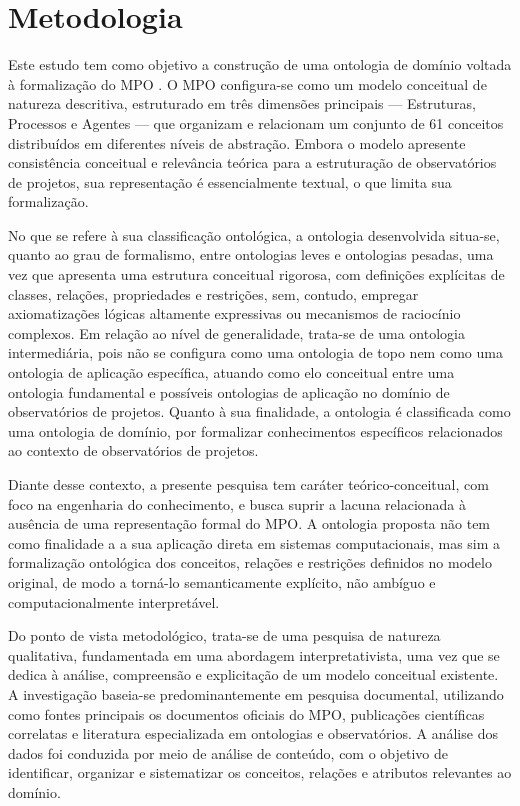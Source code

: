 \chapter{Metodologia}
Este estudo tem como objetivo a construção de uma ontologia de domínio voltada à formalização do MPO \cite{vieira2022thesis}. O MPO configura-se como um modelo conceitual de natureza descritiva, estruturado em três dimensões principais — Estruturas, Processos e Agentes — que organizam e relacionam um conjunto de 61 conceitos distribuídos em diferentes níveis de abstração. Embora o modelo apresente consistência conceitual e relevância teórica para a estruturação de observatórios de projetos, sua representação é essencialmente textual, o que limita sua formalização.

No que se refere à sua classificação ontológica, a ontologia desenvolvida situa-se, quanto ao grau de formalismo, entre ontologias leves e ontologias pesadas, uma vez que apresenta uma estrutura conceitual rigorosa, com definições explícitas de classes, relações, propriedades e restrições, sem, contudo, empregar axiomatizações lógicas altamente expressivas ou mecanismos de raciocínio complexos. Em relação ao nível de generalidade, trata-se de uma ontologia intermediária, pois não se configura como uma ontologia de topo nem como uma ontologia de aplicação específica, atuando como elo conceitual entre uma ontologia fundamental e possíveis ontologias de aplicação no domínio de observatórios de projetos. Quanto à sua finalidade, a ontologia é classificada como uma ontologia de domínio, por formalizar conhecimentos específicos relacionados ao contexto de observatórios de projetos.

Diante desse contexto, a presente pesquisa tem caráter teórico-conceitual, com foco na engenharia do conhecimento, e busca suprir a lacuna relacionada à ausência de uma representação formal do MPO. A ontologia proposta não tem como finalidade a a sua aplicação direta em sistemas computacionais, mas sim a formalização ontológica dos conceitos, relações e restrições definidos no modelo original, de modo a torná-lo semanticamente explícito, não ambíguo e computacionalmente interpretável.

Do ponto de vista metodológico, trata-se de uma pesquisa de natureza qualitativa, fundamentada em uma abordagem interpretativista, uma vez que se dedica à análise, compreensão e explicitação de um modelo conceitual existente. A investigação baseia-se predominantemente em pesquisa documental, utilizando como fontes principais os documentos oficiais do MPO, publicações científicas correlatas e literatura especializada em ontologias e observatórios. A análise dos dados foi conduzida por meio de análise de conteúdo, com o objetivo de identificar, organizar e sistematizar os conceitos, relações e atributos relevantes ao domínio.

